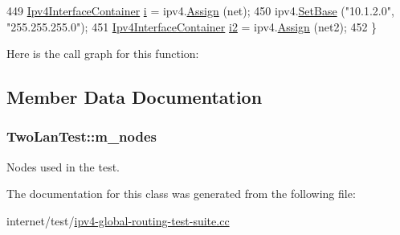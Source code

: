 \begin{DoxyCode}
449   \hyperlink{classns3_1_1Ipv4InterfaceContainer}{Ipv4InterfaceContainer} \hyperlink{bernuolliDistribution_8m_a6f6ccfcf58b31cb6412107d9d5281426}{i} = ipv4.\hyperlink{classns3_1_1Ipv4AddressHelper_af8e7f4a1a7e74c00014a1eac445a27af}{Assign} (net);
450   ipv4.\hyperlink{classns3_1_1Ipv4AddressHelper_acf7b16dd25bac67e00f5e25f90a9a035}{SetBase} (\textcolor{stringliteral}{"10.1.2.0"}, \textcolor{stringliteral}{"255.255.255.0"});
451   \hyperlink{classns3_1_1Ipv4InterfaceContainer}{Ipv4InterfaceContainer} \hyperlink{generate__test__data__lte__sinr_8m_a2fce890a7c411f1fe7c0c55ec9eb4106}{i2} = ipv4.\hyperlink{classns3_1_1Ipv4AddressHelper_af8e7f4a1a7e74c00014a1eac445a27af}{Assign} (net2);
452 \}
\end{DoxyCode}


Here is the call graph for this function\+:




\subsection{Member Data Documentation}
\subsubsection[{\texorpdfstring{m\+\_\+nodes}{m_nodes}}]{ Two\+Lan\+Test\+::m\+\_\+nodes\hspace{0.3cm}{\ttfamily [private]}}\hypertarget{classTwoLanTest_a6f71e9cc2b2a77a02f031abe9467b74c}{}\label{classTwoLanTest_a6f71e9cc2b2a77a02f031abe9467b74c}


Nodes used in the test. 



The documentation for this class was generated from the following file\+:\begin{DoxyCompactItemize}
\item 
internet/test/\hyperlink{ipv4-global-routing-test-suite_8cc}{ipv4-\/global-\/routing-\/test-\/suite.\+cc}\end{DoxyCompactItemize}
